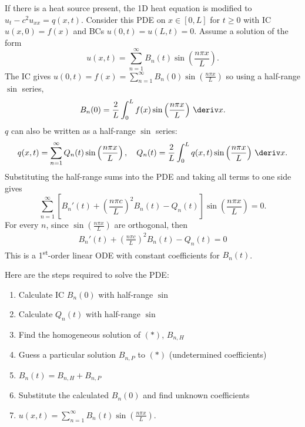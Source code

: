 \documentclass[10pt, a4paper]{article}
\begin{document}
\begin{landscape}
\begin{multicols*}{2}
    If there is a heat source present, the 1D heat equation is modified to \(u_t - c^2 u_{xx} = q(x, t)\).
    Consider this PDE on \(x \in [0, L]\) for \(t \geq 0\) with IC \(u(x, 0) = f(x)\) and BCs \(u(0, t) = u(L, t) = 0\).
    Assume a solution of the form
    \[u(x, t) = \sum_{n=1}^{\infty} B_{n}(t) \sin\left(\frac{n \pi x}{L}\right).\]
    The IC gives
    \(u(0, t) = f(x) = \sum_{n=1}^{\infty} B_{n}(0) \sin\left(\frac{n \pi x}{L}\right)\)
    so using a half-range \(\sin\) series,
    \[B_{n}(0) = \frac{2}{L} \int_{0}^{L} f(x) \sin\left(\frac{n \pi x}{L}\right) \,\deriv x.\]
    \(q\) can also be written as a half-range \(\sin\) series:
    \[
        q(x, t) = \sum_{n=1}^{\infty} Q_{n}(t) \sin \left(\frac{n \pi x}{L}\right),
        \quad
        Q_{n}(t) = \frac{2}{L} \int_{0}^{L} q(x, t) \sin \left(\frac{n \pi x}{L}\right) \,\deriv x.
    \]
    Substituting the half-range sums into the PDE and taking all terms to one side gives
    \[
        \sum_{n=1}^{\infty} \left[
            B_{n}'(t) + \left(\frac{n \pi c}{L}\right)^{2} B_{n}(t) - Q_{n}(t)
        \right] \sin \left(\frac{n \pi x}{L}\right) = 0.
    \]
    For every \(n\), since \(\sin \left(\frac{n \pi x}{L}\right)\) are orthogonal, then
    \begin{align*}
        B_{n}'(t) + \left(\frac{n \pi c}{L}\right)^{2} B_{n}(t) - Q_{n}(t) = 0  \tag{\(*\)}
    \end{align*}
    This is a 1\textsuperscript{st}-order linear ODE with constant coefficients for \(B_{n}(t)\).
    
    Here are the steps required to solve the PDE:
    \begin{enumerate}
        \item Calculate IC \(B_{n}(0)\) with half-range \(\sin\)
        \item Calculate \(Q_n(t)\) with half-range \(\sin\)
        \item Find the homogeneous solution of \((*)\), \(B_{n, H}\)
        \item Guess a particular solution \(B_{n, P}\) to \((*)\) (undetermined coefficients)
        \item \(B_{n}(t) = B_{n,H} + B_{n,P}\)
        \item Substitute the calculated \(B_{n}(0)\) and find unknown coefficients
        \item \(u(x, t) = \sum_{n=1}^{\infty} B_{n}(t) \sin \left(\frac{n \pi x}{L}\right)\).
    \end{enumerate}

\end{multicols*}


\end{landscape}
\end{document}
